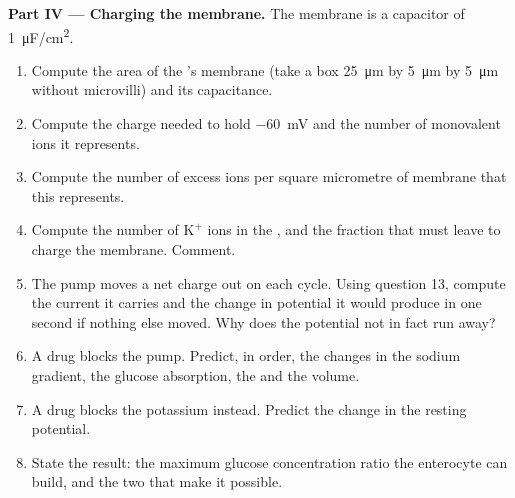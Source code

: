 \begin{problem}
\medskip
\noindent\textbf{Part IV --- Charging the membrane.}
The membrane is a capacitor of \qty{1}{\micro F/cm^2}.
\begin{enumerate}[resume]
  \item Compute the area of the 's membrane (take a box
        \qty{25}{\micro m} by \qty{5}{\micro m} by \qty{5}{\micro m}
        without microvilli) and its capacitance.
  \item Compute the charge needed to hold \qty{-60}{mV} and the number
        of monovalent ions it represents.
  \item Compute the number of excess ions per square micrometre of
        membrane that this represents.
  \item Compute the number of $\mathrm{K^+}$ ions in the , and the
        fraction that must leave to charge the membrane. Comment.
  \item The pump moves a net charge out on each cycle. Using question
        13, compute the current it carries and the change in potential
        it would produce in one second if nothing else moved. Why does
        the potential not in fact run away?
  \item A drug blocks the pump. Predict, in order, the changes in the
        sodium gradient, the glucose absorption, the  and the  volume.
  \item A drug blocks the potassium  instead. Predict the
        change in the resting potential.
  \item State the result: the maximum glucose concentration ratio the
        enterocyte can build, and the two  that make
        it possible.
\end{enumerate}
\end{problem}

